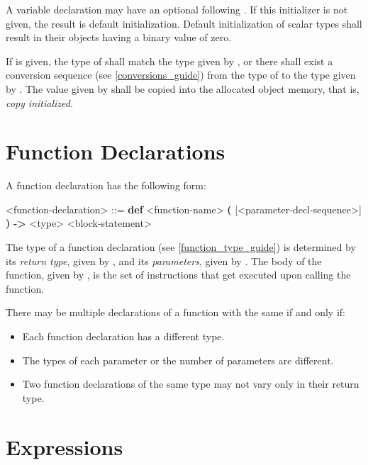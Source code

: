 A variable declaration may have an optional  following .  If this initializer is not given, the result is default initialization. Default initialization of scalar types shall result in their objects having a binary value of zero.

If  is given, the type of  shall match the type given by , or there shall exist a conversion sequence (see \ref{conversions_guide}) from the type of  to the type given by . The value given by  shall be copied into the allocated object memory, that is, \textit{copy initialized}.

\section{Function Declarations} \label{function_guide}

A function declaration has the following form:

\begin{minip}
\begin{grammar}
<function-declaration> ::=
\textbf{def} <function-name> \textbf{(} [<parameter-decl-sequence>] \textbf{)} \textbf{-\textgreater} <type> 
 <block-statement>
\end{grammar}
\end{minip}

The type of a function declaration (see \ref{function_type_guide}) is determined by its \textit{return type}, given by , and its \textit{parameters}, given by . The body of the function, given by , is the set of instructions that get executed upon calling the function.

There may be multiple declarations of a function with the same  if and only if:

\begin{itemize}
\item Each function declaration has a different type.
\item The types of each parameter or the number of parameters are different.
\item Two function declarations of the same type may not vary only in their return type.
\end{itemize} 

\section{Expressions} \label{expr_guide}

